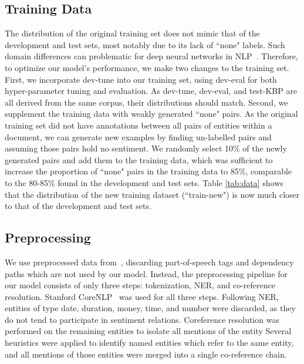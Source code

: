 \documentclass[11pt,a4paper]{article}
\begin{document}
\subsection{Training Data}
\par The distribution of the original training set does not mimic that of the development and test sets, most notably due to its lack of ``none" labels.
Such domain differences can problematic for deep neural networks in NLP~\cite{Mou:16}.
Therefore, to optimize our model's performance, we make two changes to the training set.
First, we incorporate dev-tune into our training set, using dev-eval for both hyper-parameter tuning and evaluation.
As dev-tune, dev-eval, and test-KBP are all derived from the same corpus, their distributions should match.
Second, we supplement the training data with weakly generated ``none" pairs.
As the original training set did not have annotations between all pairs of entities within a document, we can generate new examples by finding un-labelled pairs and assuming those pairs hold no sentiment.
We randomly select 10\% of the newly generated pairs and add them to the training data, which was sufficient to increase the proportion of ``none" pairs in the training data to 85\%, comparable to the 80-85\% found in the development and test sets. %
Table \ref{tab:data} shows that the distribution of the new training dataset (``train-new") is now much closer to that of the development and test sets.

\subsection{Preprocessing}
We use preprocessed data from~, discarding part-of-speech tags and dependency paths which are not used by our model.
Instead, the preprocessing pipeline for our model consists of only three steps: tokenization, NER, and co-reference resolution.
Stanford CoreNLP~\cite{Manning:14} was used for all three steps.
Following NER, entities of type date, duration, money, time, and number were discarded, as they do not tend to participate in sentiment relations.
Coreference resolution was performed on the remaining entities to isolate all mentions of the entity
Several heuristics were applied to identify named entities which refer to the same entity, and all mentions of those entities were merged into a single co-reference chain.
\end{document}

